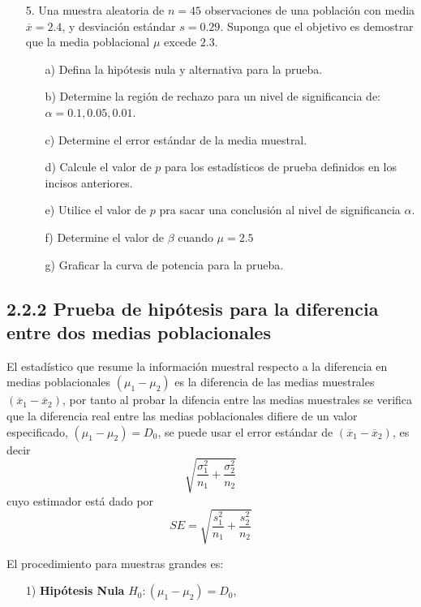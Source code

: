 \begin{frame}
\begin{frame}
\begin{itemize}
\item[5. ] Una muestra aleatoria de $n=45$ observaciones de una poblaci\'on con media $\overline{x}=2.4$, y desviaci\'on est\'andar $s=0.29$. Suponga que el objetivo es demostrar que la media poblacional $\mu$ excede $2.3$.
\begin{itemize}
\item[a) ] Defina la hip\'otesis nula y alternativa para la prueba.
\item[b) ] Determine la regi\'on de rechazo para un nivel de significancia de: $\alpha=0.1,0.05,0.01$.
\item[c) ] Determine el error est\'andar de la media muestral.
\item[d) ] Calcule el valor de $p$ para los estad\'isticos de prueba definidos en los incisos anteriores.
\item[e) ] Utilice el valor de $p$ pra sacar una conclusi\'on al nivel de significancia $\alpha$.
\item[f) ] Determine el valor de $\beta$ cuando $\mu=2.5$
\item[g) ] Graficar la curva de potencia para la prueba.

\end{itemize}
\end{itemize}





\subsection{2.2.2 Prueba de hip\'otesis para la diferencia entre dos medias poblacionales}





El estad\'istico que resume la informaci\'on muestral respecto a la diferencia en medias poblacionales $\left(\mu_{1}-\mu_{2}\right)$ es la diferencia de las medias muestrales $\left(\overline{x}_{1}-\overline{x}_{2}\right)$, por tanto al probar la difencia entre las medias muestrales se verifica que la diferencia real entre las medias poblacionales difiere de un valor especificado, $\left(\mu_{1}-\mu_{2}\right)=D_{0}$, se puede usar el error est\'andar de $\left(\overline{x}_{1}-\overline{x}_{2}\right)$, es decir
$$\sqrt{\frac{\sigma^{2}_{1}}{n_{1}}+\frac{\sigma^{2}_{2}}{n_{2}}}$$
cuyo estimador est\'a dado por
$$SE=\sqrt{\frac{s^{2}_{1}}{n_{1}}+\frac{s^{2}_{2}}{n_{2}}}$$

El procedimiento para muestras grandes es:
\begin{itemize}
\item[1) ] \textbf{Hip\'otesis Nula} $H_{0}:\left(\mu_{1}-\mu_{2}\right)=D_{0}$,\medskip


\end{itemize}
\end{frame}
\end{frame}
